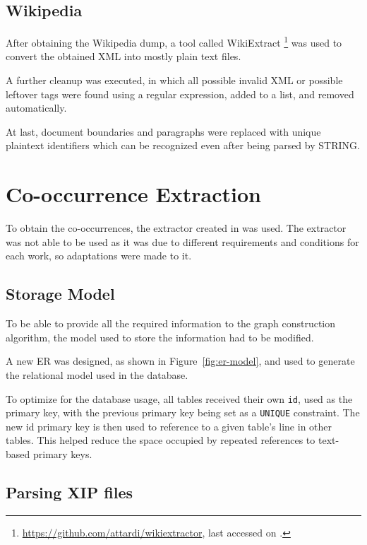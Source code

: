 \subsection{Wikipedia}

After obtaining the Wikipedia dump, a tool called WikiExtract
\footnote{\url{https://github.com/attardi/wikiextractor}, last accessed on
.} was used to convert the obtained XML into mostly plain
text files.

A further cleanup was executed, in which all possible invalid \ac{XML} or
possible leftover tags were found using a regular expression, added to a list,
and removed automatically.

At last, document boundaries and paragraphs were replaced with unique
plaintext identifiers which can be recognized even after being parsed by
\ac{STRING}.

\section{Co-occurrence Extraction}

To obtain the co-occurrences, the extractor created in \cite{correia2015syntax}
was used. The extractor was not able to be used as it was due to different
requirements and conditions for each work, so adaptations were made to it.

\subsection{Storage Model}

To be able to provide all the required information to the graph construction
algorithm, the model used to store the information had to be modified.

A new \ac{ER} was designed, as shown in Figure~\ref{fig:er-model}, and used to
generate the relational model used in the database.

To optimize for the database usage, all tables received their own \texttt{id},
used as the primary key, with the previous primary key being set as a
\texttt{UNIQUE} constraint. The new id primary key is then used to reference to
a given table's line in other tables. This helped reduce the space occupied by
repeated references to text-based primary keys.

\subsection{Parsing \ac{XIP} files}


